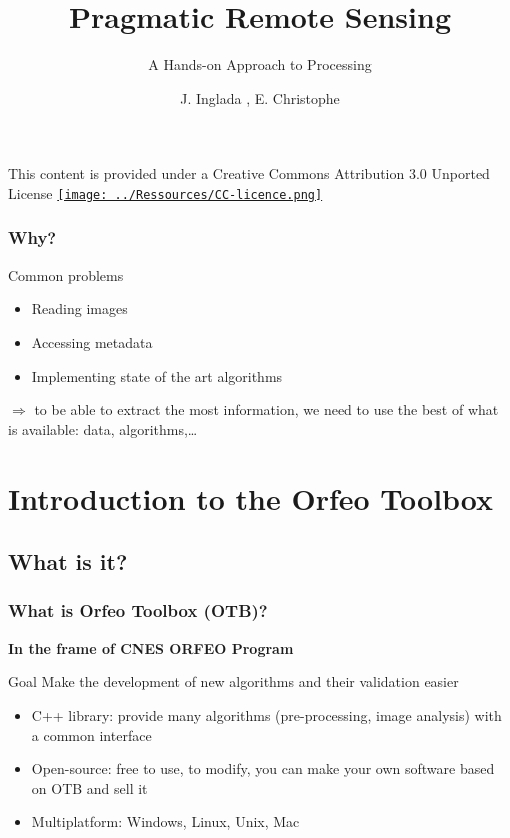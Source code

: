 \documentclass[compress]{beamer}
\title{Pragmatic Remote Sensing}
\subtitle{A Hands-on Approach to Processing} %
\author
{J. Inglada\inst{1} , E. Christophe\inst{2}}
\institute[Cesbio, Crisp] %
{\inst{1}\textsc{Centre d'Études Spatiales de la Biosphère, Toulouse, France}
\and
\inst{2}\textsc{Centre for Remote Imaging, Sensing and Processing,\\ National University of Singapore}
}
\date{}
\begin{document}
\begin{frame}
  \titlepage
{\tiny This content is provided under a Creative Commons
  Attribution 3.0 Unported License} \href{http://creativecommons.org/licenses/by/3.0/}{\texttt{[image: ../Ressources/CC-licence.png]}}
\end{frame}

\begin{frame}
\frametitle{Why?}
\begin{block}{Common problems}
\begin{itemize}
 \item Reading images
 \item Accessing metadata
 \item Implementing state of the art algorithms
\end{itemize}
\end{block}
$\Rightarrow$ to be able to \alert{extract the most information}, we
 need to \alert{use the best} of what is available: data, algorithms,\ldots
\end{frame}


\section{Introduction to the Orfeo Toolbox}



\subsection[What]{What is it?}
\begin{frame}
\frametitle{What is Orfeo Toolbox (OTB)?}

\textbf{In the frame of CNES ORFEO Program}
\begin{alertblock}{Goal}
Make the development of new algorithms and their validation easier
\end{alertblock}
\begin{block}{}
\begin{itemize}
 \item C++ library: provide many algorithms (pre-processing, image analysis) with a common interface
 \item Open-source: free to use, to modify, you can make your own software based on OTB and sell it
 \item Multiplatform: Windows, Linux, Unix, Mac
\end{itemize}
\end{block}
\end{frame}
\end{document}
